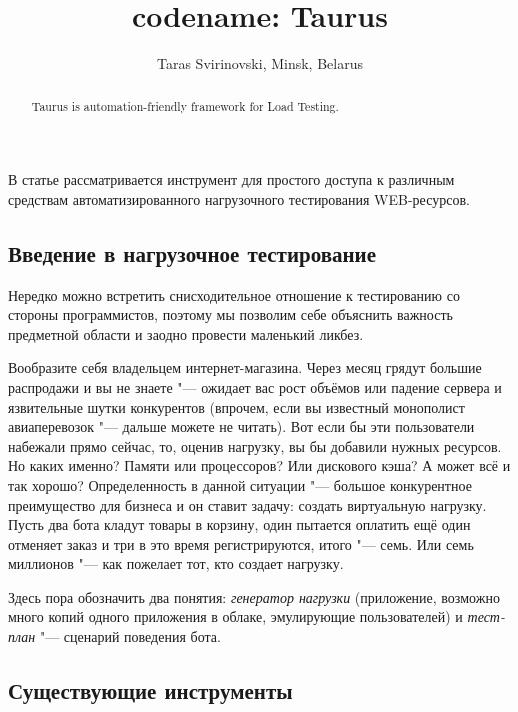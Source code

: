 \documentclass[10pt, a5paper]{article}
\begin{document}
\title{codename: Taurus}
\author{Taras Svirinovski, Minsk, Belarus}
\maketitle
\begin{abstract}
Taurus is automation-friendly framework for Load Testing.
\end{abstract}
В статье рассматривается инструмент для простого доступа к различным средствам автоматизированного нагрузочного тестирования WEB-ресурсов.

\subsection*{Введение в нагрузочное тестирование}

Нередко можно встретить снисходительное отношение к тестированию со стороны программистов, поэтому мы позволим себе объяснить важность предметной области и заодно провести маленький ликбез.

Вообразите себя владельцем интернет-магазина. Через месяц грядут большие распродажи и вы не знаете "--- ожидает вас рост объёмов или падение сервера и язвительные шутки конкурентов (впрочем, если вы известный монополист авиаперевозок "--- дальше можете не читать). Вот если бы эти пользователи набежали прямо сейчас, то, оценив нагрузку, вы бы добавили нужных ресурсов. Но каких именно? Памяти или процессоров? Или дискового кэша? А может всё и так хорошо?
Определенность в данной ситуации "--- большое конкурентное преимущество для бизнеса и он ставит задачу: создать виртуальную нагрузку. Пусть два бота кладут товары в корзину, один пытается оплатить ещё один отменяет заказ и три в это время регистрируются, итого "--- семь. Или семь миллионов "--- как пожелает тот, кто создает нагрузку.

Здесь пора обозначить два понятия: \emph{генератор нагрузки} (приложение, возможно много копий одного приложения в облаке, эмулирующие пользователей) и \emph{тест-план} "--- сценарий поведения бота.

\subsection*{Существующие инструменты}
\end{document}
